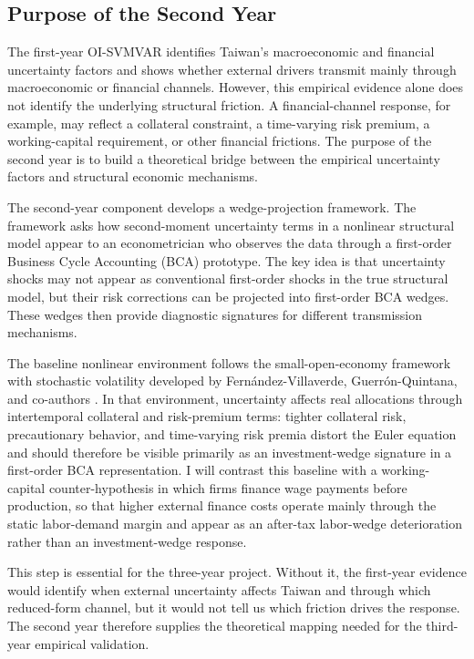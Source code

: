 \documentclass[12pt]{article}
\begin{document}
\subsection{Purpose of the Second Year}

The first-year OI-SVMVAR identifies Taiwan's macroeconomic and financial uncertainty factors
and shows whether external drivers transmit mainly through macroeconomic or financial channels.
However, this empirical evidence alone does not identify the underlying structural friction. A
financial-channel response, for example, may reflect a collateral constraint, a time-varying risk
premium, a working-capital requirement, or other financial frictions. The purpose of the second
year is to build a theoretical bridge between the empirical uncertainty factors and structural
economic mechanisms.

The second-year component develops a wedge-projection framework. The framework asks how
second-moment uncertainty terms in a nonlinear structural model appear to an econometrician
who observes the data through a first-order Business Cycle Accounting (BCA) prototype. The key
idea is that uncertainty shocks may not appear as conventional first-order shocks in the true
structural model, but their risk corrections can be projected into first-order BCA wedges. These
wedges then provide diagnostic signatures for different transmission mechanisms.

The baseline nonlinear environment follows the small-open-economy framework with stochastic
volatility developed by Fern\'andez-Villaverde, Guerr\'on-Quintana, and co-authors
\citep{fernandez-villaverde2011risk,fernandez-villaverde2020uncertainty}. In that environment,
uncertainty affects real allocations through intertemporal collateral and risk-premium terms:
tighter collateral risk, precautionary behavior, and time-varying risk premia distort the Euler
equation and should therefore be visible primarily as an investment-wedge signature in a
first-order BCA representation. I will contrast this baseline with a working-capital
counter-hypothesis in which firms finance wage payments before production, so that higher
external finance costs operate mainly through the static labor-demand margin and appear as an
after-tax labor-wedge deterioration rather than an investment-wedge response.

This step is essential for the three-year project. Without it, the first-year evidence would identify
when external uncertainty affects Taiwan and through which reduced-form channel, but it would
not tell us which friction drives the response. The second year therefore supplies the theoretical
mapping needed for the third-year empirical validation.
\end{document}
